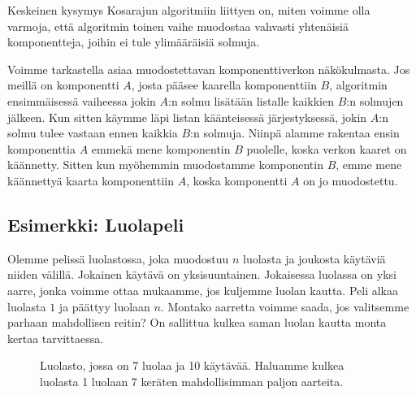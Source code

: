 Keskeinen kysymys Kosarajun algoritmiin liittyen on,
miten voimme olla varmoja, että algoritmin toinen vaihe
muodostaa vahvasti yhtenäisiä komponentteja,
joihin ei tule ylimääräisiä solmuja.

Voimme tarkastella asiaa muodostettavan
komponenttiverkon näkökul\-masta.
Jos meillä on komponentti $A$, josta pääsee kaarella
komponenttiin $B$, 
algoritmin ensimmäisessä vaiheessa
jokin $A$:n solmu lisätään listalle kaikkien $B$:n
solmujen jälkeen.
Kun sitten käymme läpi listan käänteisessä järjestyk\-sessä,
jokin $A$:n solmu tulee vastaan ennen kaikkia $B$:n
solmuja.
Niinpä alamme rakentaa ensin komponenttia $A$
emmekä mene komponentin $B$ puolelle,
koska verkon kaaret on käännetty.
Sitten kun myöhemmin muodostamme komponentin $B$,
emme mene käännettyä kaarta komponenttiin $A$,
koska komponentti $A$ on jo muodostettu.

\subsection{Esimerkki: Luolapeli}

Olemme pelissä luolastossa, joka muodostuu $n$ luolasta ja
joukosta käytäviä niiden välillä.
Jokainen käytävä on yksisuuntainen.
Jokaisessa luolassa on yksi aarre, jonka voimme ottaa mukaamme,
jos kuljemme luolan kautta.
Peli alkaa luolasta $1$ ja päättyy luolaan $n$.
Montako aarretta voimme saada, jos valitsemme parhaan
mahdollisen reitin?
On sallittua kulkea saman luolan kautta monta kertaa tarvittaessa.

\begin{figure}
\center
\begin{center}
\end{center}
\caption{Luolasto, jossa on 7 luolaa ja 10 käytävää.
Haluamme kulkea luolasta 1 luolaan 7 keräten mahdollisimman paljon aarteita.}
\label{fig:luopel}
\end{figure}

